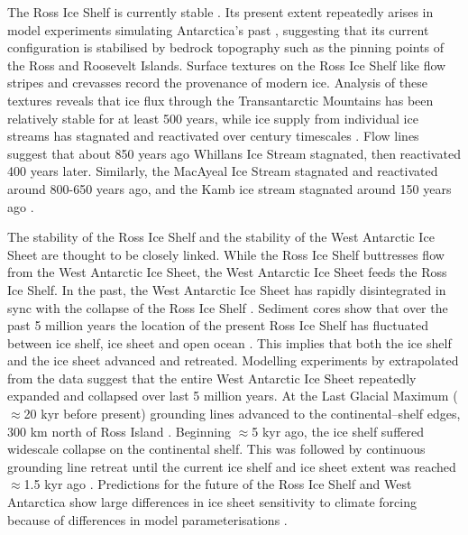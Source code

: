 The Ross Ice Shelf is currently stable \citep{paolo2015volume}.  Its present extent repeatedly arises in model experiments simulating Antarctica's past \citep{pollard2009modelling}, suggesting that its current configuration is stabilised by bedrock topography such as the pinning points of the Ross and Roosevelt Islands. Surface textures on the Ross Ice Shelf like flow stripes and crevasses record the provenance of modern ice. Analysis of these textures reveals that ice flux through the Transantarctic Mountains has been relatively stable for at least 500 years, while ice supply from individual ice streams has stagnated and reactivated over century timescales \citep{hulbe2007century}. Flow lines suggest that about 850 years ago Whillans Ice Stream stagnated, then reactivated 400 years later. Similarly, the MacAyeal Ice Stream stagnated and reactivated around 800-650 years ago, and the Kamb ice stream stagnated around 150 years ago \citep{hulbe2007century}.

The stability of the Ross Ice Shelf and the stability of the West Antarctic Ice Sheet are thought to be closely linked. While the Ross Ice Shelf buttresses flow from the West Antarctic Ice Sheet, the West Antarctic Ice Sheet feeds the Ross Ice Shelf. In the past, the West Antarctic Ice Sheet has rapidly disintegrated in sync with the collapse of the Ross Ice Shelf \citep{pollard2009modelling}. 
Sediment cores  show that over the past 5 million years the location of the present Ross Ice Shelf has fluctuated between ice shelf, ice sheet and open ocean \citep{naish2009obliquity}. This implies that both the ice shelf and the ice sheet advanced and retreated.
Modelling experiments by \cite{pollard2009modelling} extrapolated from the \cite{naish2009obliquity} data suggest that the entire West Antarctic Ice Sheet repeatedly expanded and collapsed over last 5 million years.
At the Last Glacial Maximum ($\approx$20 kyr before present) grounding lines advanced to the continental--shelf edges, 300 km north of Ross Island  \citep{mckay2008retreat} .
Beginning $\approx$5 kyr ago, the ice shelf suffered widescale collapse  on the continental shelf. This was followed by continuous grounding line retreat until the current ice shelf and ice sheet extent was reached $\approx$1.5 kyr ago \citep{yokoyama2016widespread}. 
Predictions for the future of the Ross Ice Shelf and West Antarctica show large differences in ice sheet sensitivity to climate forcing because of differences in model parameterisations \citep{deconto2016contribution,golledge2015multi,edwards2021projected}.


